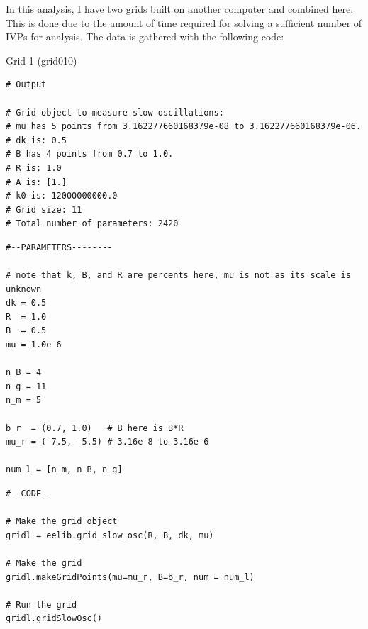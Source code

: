 \documentclass[11pt]{article}
\makeatletter
\newcommand{\boxspacing}{\kern\kvtcb@left@rule\kern\kvtcb@boxsep}
\newcommand{\prompt}[4]{
        {\ttfamily\llap{{\color{#2}[#3]:\hspace{3pt}#4}}\vspace{-\baselineskip}}
    }
\makeatother
\begin{document}
In this analysis, I have two grids built on another computer and
combined here. This is done due to the amount of time required for
solving a sufficient number of IVPs for analysis. The data is gathered
with the following code:

    Grid 1 (grid010)

\begin{tcolorbox}[breakable, size=fbox, boxrule=1pt, pad at break*=1mm,colback=cellbackground, colframe=cellborder]
\prompt{In}{incolor}{41}{\boxspacing}
\begin{Verbatim}[commandchars=\\\{\}]
# Output

# Grid object to measure slow oscillations:
# mu has 5 points from 3.162277660168379e-08 to 3.162277660168379e-06.
# dk is: 0.5
# B has 4 points from 0.7 to 1.0.
# R is: 1.0
# A is: [1.]
# k0 is: 12000000000.0
# Grid size: 11
# Total number of parameters: 2420
\end{Verbatim}
\end{tcolorbox}
\begin{tcolorbox}[breakable, size=fbox, boxrule=1pt, pad at break*=1mm,colback=cellbackground, colframe=cellborder]
\prompt{In}{incolor}{41}{\boxspacing}
\begin{Verbatim}[commandchars=\\\{\}]
#--PARAMETERS--------

# note that k, B, and R are percents here, mu is not as its scale is unknown
dk = 0.5
R  = 1.0
B  = 0.5
mu = 1.0e-6

n_B = 4
n_g = 11
n_m = 5

b_r  = (0.7, 1.0)   # B here is B*R 
mu_r = (-7.5, -5.5) # 3.16e-8 to 3.16e-6

num_l = [n_m, n_B, n_g]
\end{Verbatim}
\end{tcolorbox}
\begin{tcolorbox}[breakable, size=fbox, boxrule=1pt, pad at break*=1mm,colback=cellbackground, colframe=cellborder]
\prompt{In}{incolor}{41}{\boxspacing}
\begin{Verbatim}[commandchars=\\\{\}]
#--CODE--

# Make the grid object
gridl = eelib.grid_slow_osc(R, B, dk, mu)

# Make the grid
gridl.makeGridPoints(mu=mu_r, B=b_r, num = num_l)

# Run the grid
gridl.gridSlowOsc()
\end{Verbatim}
\end{tcolorbox}
\end{document}
